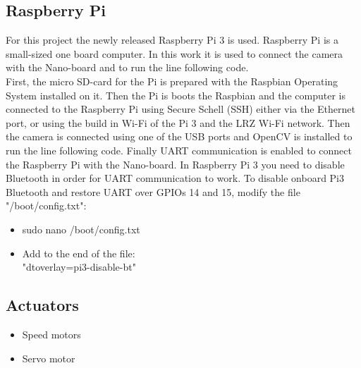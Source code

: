 \documentclass[11pt,twocolumn]{article}
\begin{document}
\subsection{Raspberry Pi}
For this project the newly released Raspberry Pi 3 is used. Raspberry Pi is a small-sized one board computer. In this work it is used to connect the camera with the Nano-board and to run the line following code.\\
First, the micro SD-card for the Pi is prepared with the Raspbian Operating System installed on it. Then the Pi is boots the Raspbian and the computer is connected to the Raspberry Pi using Secure Schell (SSH) either via the Ethernet port, or using the build in Wi-Fi of the Pi 3 and the LRZ Wi-Fi network. Then the camera is connected using one of the USB ports and OpenCV is installed to run the line following code. Finally UART communication is enabled to connect the Raspberry Pi with the Nano-board. In Raspberry Pi 3 you need to disable Bluetooth in order for UART communication to work. To disable onboard Pi3 Bluetooth and restore UART over GPIOs 14 and 15, modify the file "/boot/config.txt":
\begin{itemize}
\item {sudo nano /boot/config.txt}
\item {Add to the end of the file: \\"dtoverlay=pi3-disable-bt"}
\end{itemize}
\subsection{Actuators}
\begin{itemize}
	\item{Speed motors}
	\item{Servo motor}
\end{itemize}
\end{document}
